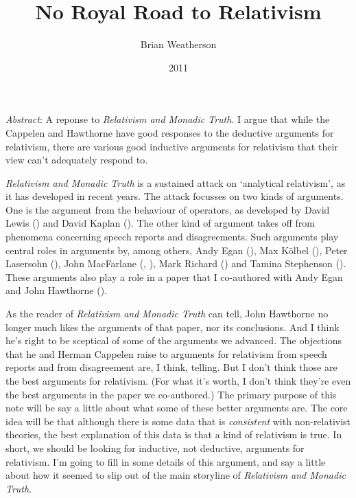 \documentclass[
  11pt,
  letterpaper,
  DIV=11,
  numbers=noendperiod,
  twoside]{scrartcl}
\title{No Royal Road to Relativism}
\author{Brian Weatherson}
\date{2011}
\renewenvironment{abstract}
 {\vspace{-1.25cm}
 \quotation\small\noindent\emph{Abstract}:}
 {\endquotation}
\renewenvironment{abstract}
 {\quotation\small\noindent\emph{Abstract}:}
 {\endquotation\vspace{-0.02cm}}
\begin{document}
\maketitle
\begin{abstract}
A reponse to \emph{Relativism and Monadic Truth}. I argue that while the
Cappelen and Hawthorne have good responses to the deductive arguments
for relativism, there are various good inductive arguments for
relativism that their view can't adequately respond to.
\end{abstract}


\emph{Relativism and Monadic Truth} is a sustained attack on `analytical
relativism', as it has developed in recent years. The attack focusses on
two kinds of arguments. One is the argument from the behaviour of
operators, as developed by David Lewis ()
and David Kaplan (). The other kind
of argument takes off from phenomena concerning speech reports and
disagreements. Such arguments play central roles in arguments by, among
others, Andy Egan (), Max Kölbel
(), Peter Lasersohn
(), John MacFarlane
(,
), Mark Richard
() and Tamina Stephenson
(). These arguments also play
a role in a paper that I co-authored with Andy Egan and John Hawthorne
().

As the reader of \emph{Relativism and Monadic Truth} can tell, John
Hawthorne no longer much likes the arguments of that paper, nor its
conclusions. And I think he's right to be sceptical of some of the
arguments we advanced. The objections that he and Herman Cappelen raise
to arguments for relativism from speech reports and from disagreement
are, I think, telling. But I don't think those are the best arguments
for relativism. (For what it's worth, I don't think they're even the
best arguments in the paper we co-authored.) The primary purpose of this
note will be say a little about what some of these better arguments are.
The core idea will be that although there is some data that is
\emph{consistent} with non-relativist theories, the best explanation of
this data is that a kind of relativism is true. In short, we should be
looking for inductive, not deductive, arguments for relativism. I'm
going to fill in some details of this argument, and say a little about
how it seemed to slip out of the main storyline of \emph{Relativism and
Monadic Truth}.
\end{document}
